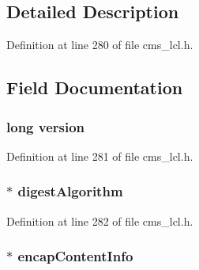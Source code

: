 \subsection{Detailed Description}


Definition at line 280 of file cms\+\_\+lcl.\+h.



\subsection{Field Documentation}
\subsubsection[{\texorpdfstring{version}{version}}]{\setlength{\rightskip}{0pt plus 5cm}long version}\hypertarget{struct_c_m_s___digested_data__st_a17afc5cf84cee4b2123665f28ce85c9f}{}\label{struct_c_m_s___digested_data__st_a17afc5cf84cee4b2123665f28ce85c9f}


Definition at line 281 of file cms\+\_\+lcl.\+h.

\subsubsection[{\texorpdfstring{digest\+Algorithm}{digestAlgorithm}}]{$\ast$ digest\+Algorithm}\hypertarget{struct_c_m_s___digested_data__st_a3db9734e20b06af31aabcfcfc6b62797}{}\label{struct_c_m_s___digested_data__st_a3db9734e20b06af31aabcfcfc6b62797}


Definition at line 282 of file cms\+\_\+lcl.\+h.

\subsubsection[{\texorpdfstring{encap\+Content\+Info}{encapContentInfo}}]{$\ast$ encap\+Content\+Info}\hypertarget{struct_c_m_s___digested_data__st_a436b5725775d32c6f9a979b8d5a4f8b5}{}\label{struct_c_m_s___digested_data__st_a436b5725775d32c6f9a979b8d5a4f8b5}


